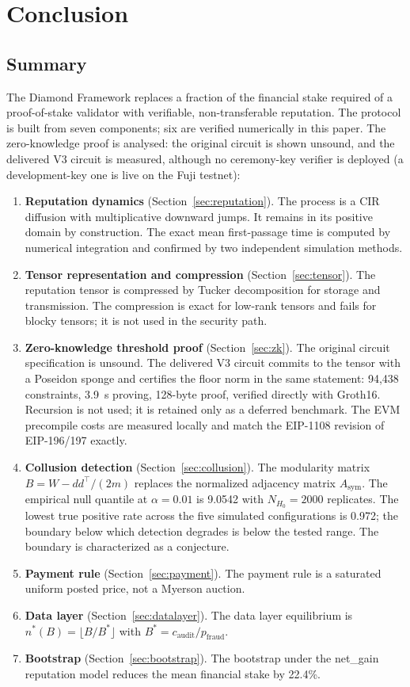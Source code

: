 \documentclass[11pt,a4paper]{article}
\numberwithin{equation}{section}
\numberwithin{table}{section}
\begin{document}
\section{Conclusion}
\label{sec:conclusion}

\subsection{Summary}
The Diamond Framework replaces a fraction of the financial stake required of a proof-of-stake validator with verifiable, non-transferable reputation. The protocol is built from seven components; six are verified numerically in this paper. The zero-knowledge proof is analysed: the original circuit is shown unsound, and the delivered V3 circuit is measured, although no ceremony-key verifier is deployed (a development-key one is live on the Fuji testnet):

\begin{enumerate}[leftmargin=*]
\item \textbf{Reputation dynamics} (Section~\ref{sec:reputation}). The process is a CIR diffusion with multiplicative downward jumps. It remains in its positive domain by construction. The exact mean first-passage time is computed by numerical integration and confirmed by two independent simulation methods.
\item \textbf{Tensor representation and compression} (Section~\ref{sec:tensor}). The reputation tensor is compressed by Tucker decomposition for storage and transmission. The compression is exact for low-rank tensors and fails for blocky tensors; it is not used in the security path.
\item \textbf{Zero-knowledge threshold proof} (Section~\ref{sec:zk}). The original circuit specification is unsound. The delivered V3 circuit commits to the tensor with a Poseidon sponge and certifies the floor norm in the same statement: 94{,}438 constraints, 3.9~s proving, 128-byte proof, verified directly with Groth16. Recursion is not used; it is retained only as a deferred benchmark. The EVM precompile costs are measured locally and match the EIP-1108 revision of EIP-196/197 exactly.
\item \textbf{Collusion detection} (Section~\ref{sec:collusion}). The modularity matrix $B = W - dd^{\top}/(2m)$ replaces the normalized adjacency matrix $A_{\mathrm{sym}}$. The empirical null quantile at $\alpha = 0.01$ is 9.0542 with $N_{H_0} = 2000$ replicates. The lowest true positive rate across the five simulated configurations is 0.972; the boundary below which detection degrades is below the tested range. The boundary is characterized as a conjecture.
\item \textbf{Payment rule} (Section~\ref{sec:payment}). The payment rule is a saturated uniform posted price, not a Myerson auction.
\item \textbf{Data layer} (Section~\ref{sec:datalayer}). The data layer equilibrium is $n^*(B) = \lfloor B/B^* \rfloor$ with $B^* = c_{\mathrm{audit}}/p_{\mathrm{fraud}}$.
\item \textbf{Bootstrap} (Section~\ref{sec:bootstrap}). The bootstrap under the net\_gain reputation model reduces the mean financial stake by 22.4\%.
\end{enumerate}
\end{document}
